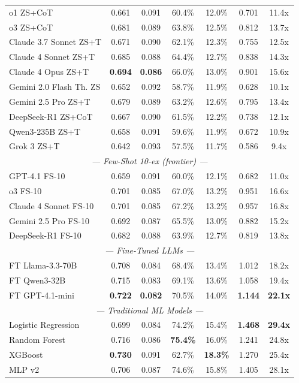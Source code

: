 \documentclass[12pt, a4paper]{article}
\begin{document}
\begin{table}[H]
\begin{tabular}{@{}lcccccc@{}}
o1 ZS+CoT             & 0.661 & 0.091 & 60.4\% & 12.0\% & 0.701 & 11.4x\\
o3 ZS+CoT             & 0.681 & 0.089 & 63.8\% & 12.5\% & 0.812 & 13.7x\\
Claude 3.7 Sonnet ZS+T  & 0.671 & 0.090 & 62.1\% & 12.3\% & 0.755 & 12.5x\\
Claude 4 Sonnet ZS+T    & 0.685 & 0.088 & 64.4\% & 12.7\% & 0.838 & 14.3x\\
Claude 4 Opus ZS+T      & \bf 0.694 & \bf 0.086 & 66.0\% & 13.0\% & 0.901 & 15.6x\\
Gemini 2.0 Flash Th. ZS  & 0.652 & 0.092 & 58.7\% & 11.9\% & 0.628 & 10.1x\\
Gemini 2.5 Pro ZS+T     & 0.679 & 0.089 & 63.2\% & 12.6\% & 0.795 & 13.4x\\
DeepSeek-R1 ZS+CoT      & 0.667 & 0.090 & 61.5\% & 12.2\% & 0.738 & 12.1x\\
Qwen3-235B ZS+T        & 0.658 & 0.091 & 59.6\% & 11.9\% & 0.672 & 10.9x\\
Grok 3 ZS+T            & 0.642 & 0.093 & 57.5\% & 11.7\% & 0.586 & 9.4x\\
\midrule
\multicolumn{7}{c}{\textit{--- Few-Shot 10-ex (frontier) ---}}\\
GPT-4.1 FS-10           & 0.659 & 0.091 & 60.0\% & 12.1\% & 0.682 & 11.0x\\
o3 FS-10              & 0.701 & 0.085 & 67.0\% & 13.2\% & 0.951 & 16.6x\\
Claude 4 Sonnet FS-10    & 0.701 & 0.085 & 67.2\% & 13.2\% & 0.957 & 16.8x\\
Gemini 2.5 Pro FS-10     & 0.692 & 0.087 & 65.5\% & 13.0\% & 0.882 & 15.2x\\
DeepSeek-R1 FS-10       & 0.682 & 0.088 & 63.9\% & 12.7\% & 0.819 & 13.8x\\
\midrule
\multicolumn{7}{c}{\textit{--- Fine-Tuned LLMs ---}}\\
FT Llama-3.3-70B        & 0.708 & 0.084 & 68.4\% & 13.4\% & 1.012 & 18.2x\\
FT Qwen3-32B           & 0.715 & 0.083 & 69.1\% & 13.6\% & 1.058 & 19.4x\\
FT GPT-4.1-mini        & \bf 0.722 & \bf 0.082 & 70.5\% & 14.0\% & \bf 1.144 & \bf 22.1x\\
\midrule
\multicolumn{7}{c}{\textit{--- Traditional ML Models ---}}\\
Logistic Regression   & 0.699 & \cellcolor{best}0.084 & 74.2\% & 15.4\% & \cellcolor{best}\bf 1.468 & \cellcolor{best}\bf 29.4x\\
Random Forest         & 0.716 & 0.086 & \bf 75.4\% & 16.0\% & 1.241 & 24.8x\\
XGBoost               & \bf 0.730 & 0.091 & 62.7\% & \bf 18.3\% & 1.270 & 25.4x\\
MLP v2                & 0.706 & 0.087 & 74.6\% & 15.8\% & 1.405 & 28.1x\\
\bottomrule
\end{tabular}
\end{table}
\end{document}
